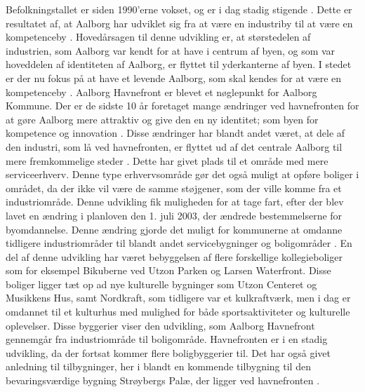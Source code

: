 \newline \indent{     }  Befolkningstallet er siden 1990'erne vokset, og er i dag stadig stigende \citep{indbyggertal}. Dette er resultatet af, at Aalborg har udviklet sig fra at være en industriby til at være en kompetenceby \citep{kommuneplan3}. Hovedårsagen til denne udvikling er, at størstedelen af industrien, som Aalborg var kendt for at have i centrum af byen, og som var hoveddelen af identiteten af Aalborg, er flyttet til yderkanterne af byen. I stedet er der nu fokus på at have et levende Aalborg, som skal kendes for at være en kompetenceby \citep{kommuneplan3}.
\newline \indent{     }  Aalborg Havnefront er blevet et nøglepunkt for Aalborg Kommune. Der er de sidste 10 år foretaget mange ændringer ved havnefronten for at gøre Aalborg mere attraktiv og give den en ny identitet; som byen for kompetence og innovation \citep{brughavnen}.
\newline \indent{     }  Disse ændringer har blandt andet været, at dele af den industri, som lå ved havnefronten, er flyttet ud af det centrale Aalborg til mere fremkommelige steder \citep{kommuneplan3}. Dette har givet plads til et område med mere serviceerhverv. Denne type erhvervsområde gør det også muligt at opføre boliger i området, da der ikke vil være de samme støjgener, som der ville komme fra et industriområde. Denne udvikling fik muligheden for at tage fart, efter der blev lavet en ændring i planloven den 1. juli 2003, der ændrede bestemmelserne for byomdannelse. Denne ændring gjorde det muligt for kommunerne at omdanne tidligere industriområder til blandt andet servicebygninger og boligområder \citep{sort}. En del af denne udvikling har været bebyggelsen af flere forskellige kollegieboliger som for eksempel Bikuberne ved Utzon Parken og Larsen Waterfront. Disse boliger ligger tæt op ad nye kulturelle bygninger som Utzon Centeret og Musikkens Hus, samt Nordkraft, som tidligere var et kulkraftværk, men i dag er omdannet til et kulturhus med mulighed for både sportsaktiviteter og kulturelle oplevelser. Disse byggerier viser den udvikling, som Aalborg Havnefront gennemgår fra industriområde til boligområde. Havnefronten er i en stadig udvikling, da der fortsat kommer flere boligbyggerier til. Det har også givet anledning til tilbygninger, her i blandt en kommende tilbygning til den bevaringsværdige bygning Strøybergs Palæ, der ligger ved havnefronten \citep{havnefronterne}.

